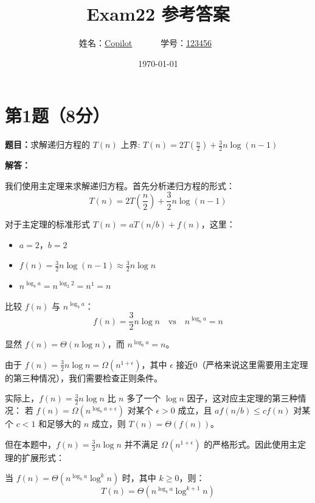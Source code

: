 \documentclass[UTF8,12pt,a4paper]{ctexart}
\title{Exam22 参考答案}
\author{
	姓名：\underline{Copilot}~~~~~~
	学号：\underline{123456}~~~~~~}
\date{\today}
\begin{document}
\fancyfoot[C]{\thepage}

\maketitle




\section*{第1题（8分）}
\textbf{题目：}求解递归方程的 $T(n)$ 上界: $T(n)=2 T(\frac{n}{2})+\frac{3}{2} n \log (n-1)$

\textbf{解答：}

我们使用主定理来求解递归方程。首先分析递归方程的形式：
$$T(n)=2 T\left(\frac{n}{2}\right)+\frac{3}{2} n \log (n-1)$$

对于主定理的标准形式 $T(n) = a T(n/b) + f(n)$，这里：
\begin{itemize}
	\item $a = 2$，$b = 2$
	\item $f(n) = \frac{3}{2} n \log (n-1) \approx \frac{3}{2} n \log n$
	\item $n^{\log_b a} = n^{\log_2 2} = n^1 = n$
\end{itemize}

比较 $f(n)$ 与 $n^{\log_b a}$：
$$f(n) = \frac{3}{2} n \log n \quad \text{vs} \quad n^{\log_b a} = n$$

显然 $f(n) = \Theta(n \log n)$，而 $n^{\log_b a} = n$。

由于 $f(n) = \frac{3}{2} n \log n = \Omega(n^{1+\epsilon})$，其中 $\epsilon$ 接近0（严格来说这里需要用主定理的第三种情况），我们需要检查正则条件。

实际上，$f(n) = \frac{3}{2} n \log n$ 比 $n$ 多了一个 $\log n$ 因子，这对应主定理的第三种情况：
若 $f(n) = \Omega(n^{\log_b a + \epsilon})$ 对某个 $\epsilon > 0$ 成立，且 $a f(n/b) \leq c f(n)$ 对某个 $c < 1$ 和足够大的 $n$ 成立，则 $T(n) = \Theta(f(n))$。

但在本题中，$f(n) = \frac{3}{2} n \log n$ 并不满足 $\Omega(n^{1+\epsilon})$ 的严格形式。因此使用主定理的扩展形式：

当 $f(n) = \Theta(n^{\log_b a} \log^k n)$ 时，其中 $k \geq 0$，则：
$$T(n) = \Theta(n^{\log_b a} \log^{k+1} n)$$
\end{document}
